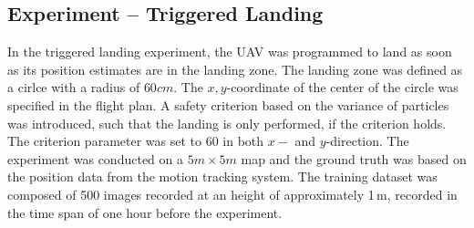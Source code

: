 \subsection{Experiment -- Triggered Landing}

In the triggered landing experiment, the UAV was programmed to land as soon as its position estimates are in the landing zone. The landing zone was defined as a cirlce with a radius of $60cm$. The $x,y$-coordinate of the center of the circle was specified in the flight plan. A safety criterion based on the variance of particles was introduced, such that the landing is only performed, if the criterion holds. The criterion parameter was set to 60 in both $x-$ and $y$-direction. The experiment was conducted on a $5m \times 5m$ map and the ground truth was based on the position data from the motion tracking system. The training dataset was composed of 500 images recorded at an height of approximately 1\,m, recorded in the time span of one hour before the experiment.   